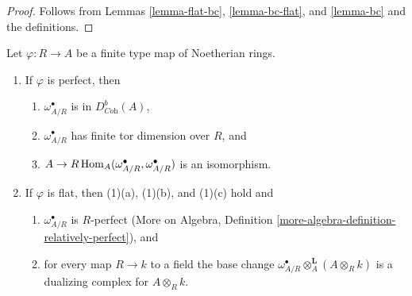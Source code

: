 \begin{proof}
Follows from Lemmas \ref{lemma-flat-bc}, \ref{lemma-bc-flat}, and
\ref{lemma-bc} and the definitions.
\end{proof}

\begin{lemma}
\label{lemma-relative-dualizing-algebraic}
Let $\varphi : R \to A$ be a finite type map of Noetherian rings.
\begin{enumerate}
\item If $\varphi$ is perfect, then
\begin{enumerate}
\item $\omega_{A/R}^\bullet$ is in $D^b_{\textit{Coh}}(A)$,
\item $\omega_{A/R}^\bullet$ has finite tor dimension over $R$, and
\item $A \to R\mathop{\mathrm{Hom}}\nolimits_A(\omega_{A/R}^\bullet, \omega_{A/R}^\bullet)$
is an isomorphism.
\end{enumerate}
\item If $\varphi$ is flat, then (1)(a), (1)(b), and (1)(c) hold and
\begin{enumerate}
\item $\omega_{A/R}^\bullet$ is $R$-perfect
(More on Algebra,
Definition \ref{more-algebra-definition-relatively-perfect}), and
\item for every map $R \to k$ to a field the base change
$\omega_{A/R}^\bullet \otimes_A^\mathbf{L} (A \otimes_R k)$
is a dualizing complex for $A \otimes_R k$.
\end{enumerate}
\end{enumerate}
\end{lemma}


